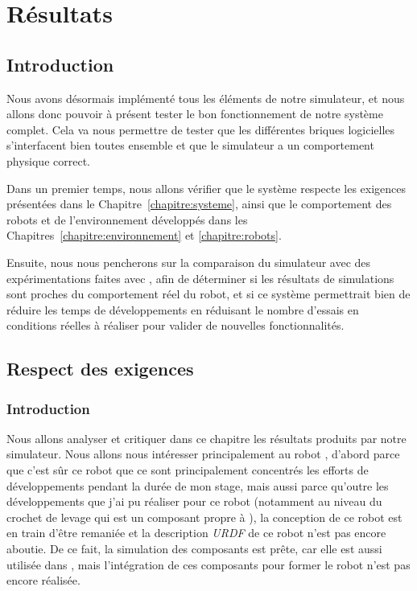 \chapter{Résultats}
\label{chapter:resultats}
	
	\section{Introduction}

		Nous avons désormais implémenté tous les éléments de notre simulateur, et nous allons donc pouvoir à présent tester le bon fonctionnement de notre système complet. Cela va nous permettre de tester que les différentes briques logicielles s'interfacent bien toutes ensemble et que le simulateur a un comportement physique correct.
		
		Dans un premier temps, nous allons vérifier que le système respecte les exigences présentées dans le Chapitre~\ref{chapitre:systeme}, ainsi que le comportement des robots et de l'environnement développés dans les Chapitres~\ref{chapitre:environnement} et \ref{chapitre:robots}.

		Ensuite, nous nous pencherons sur la comparaison du simulateur avec des expérimentations faites avec \argos{}, afin de déterminer si les résultats de simulations sont proches du comportement réel du robot, et si ce système permettrait bien de réduire les temps de développements en réduisant le nombre d'essais en conditions réelles à réaliser pour valider de nouvelles fonctionnalités.

	\section{Respect des exigences}

		\subsection{Introduction}

			Nous allons analyser et critiquer dans ce chapitre les résultats produits par notre simulateur. Nous allons nous intéresser principalement au robot \argos{}, d'abord parce que c'est sûr ce robot que ce sont principalement concentrés les efforts de développements pendant la durée de mon stage, mais aussi parce qu'outre les développements que j'ai pu réaliser pour ce robot (notamment au niveau du crochet de levage qui est un composant propre à \atoll{}), la conception de ce robot est en train d'être remaniée et la description \textit{URDF} de ce robot n'est pas encore aboutie. De ce fait, la simulation des composants est prête, car elle est aussi utilisée dans \argos{}, mais l'intégration de ces composants pour former le robot \atoll{} n'est pas encore réalisée.

